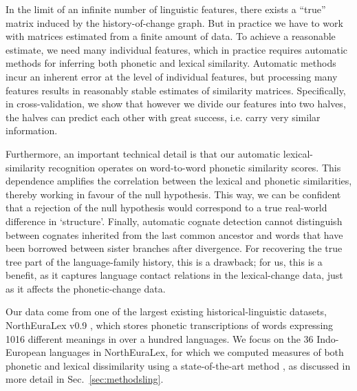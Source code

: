 \documentclass[a4]{article}
\newcommand{\+}[1]{\mathbf{#1}}
\begin{document}
In the limit of an infinite number of linguistic features, there exists a ``true'' matrix induced by the history-of-change graph. But in practice we have to work with  matrices estimated from a finite amount of data. To achieve a reasonable estimate, we need many individual features, which in practice requires automatic methods for inferring both phonetic and lexical similarity. Automatic methods incur an inherent error at the level of individual features, but processing many features results in reasonably stable estimates of similarity matrices. Specifically, in cross-validation, we show that however we divide our features into two halves, the halves can predict each other with great success, i.e. carry very similar information.

Furthermore, an important technical detail is that our automatic lexical-similarity recognition operates on word-to-word phonetic similarity scores. This dependence amplifies the correlation between the lexical and phonetic similarities, thereby working in favour of the null hypothesis. This way, we can be confident that a rejection of the null hypothesis would correspond to a true real-world difference in `structure'. Finally, automatic cognate detection cannot distinguish between cognates inherited from the last common ancestor and words that have been borrowed between sister branches after divergence. For recovering the true tree part of the language-family history, this is a drawback; for us, this is a benefit, as it captures language contact relations in the lexical-change data, just as it affects the phonetic-change data.

Our data come from one of the largest existing historical-linguistic datasets, NorthEuraLex v0.9 \cite{NorthEuraLex}, which stores phonetic transcriptions of words expressing 1016 different meanings in over a hundred languages. We focus on the 36 Indo-European languages in NorthEuraLex, for which we computed measures of both phonetic and lexical dissimilarity using a state-of-the-art method \cite{Dellert-2018}, as discussed in more detail in Sec.~\ref{sec:methodsling}. 
\end{document}
